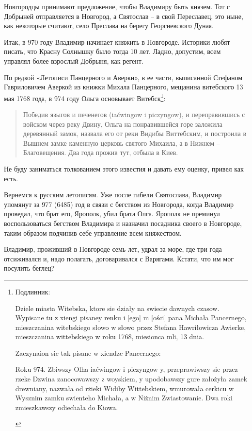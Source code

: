 Новгородцы принимают предложение, чтобы Владимиру быть князем. Тот с Добрыней отправляется в Новгород, а Святослав – в свой Переславец, это ныне, как некоторые считают, село Преслава на берегу Георгиевского Дуная.

Итак, в 970 году Владимир начинает княжить в Новгороде. Историки любят писать, что Красну Солнышку было тогда 10 лет. Ладно, допустим, всем управлял более взрослый Добрыня, как регент.

По редкой «Летописи Панцерного и Аверки», в ее части, выписанной Стефаном Гавриловичем Аверкой из книжки Михала Панцерного, мещанина витебского 13 мая 1768 года, в 974 году Ольга основывает Витебск\footnote{Подлинник:
\begin{otherlanguage}{polish}
Dziele miasta Witebska, ktore sie działy na swiecie dawnych czasow. Wypisane tu z xiengi pisaney renku i [ego] m [ości] pana Michała Pancernego, mieszczanina witebskiego słowo w słowo przez Stefana Hawriłowicza Awierke, mieszczanina
wittebskiego w roku 1768, miesionca mli, 13 dnia.

Zaczynaion sie tak pisane w xiendze Pancernego:

Roku 974. Zbiwszy Olha iaćwingow i piczyngow y, przeprawiwszy sie przez rzeke Dzwina zanocowawszy z woyskiem, y upodobawszy gure założyła zamek drewniany, nazwała od rżieki Widiby Wittebskiem, wmurowała cerkicu w Wysznim zamku swienteho Michała, a w Niżnim Zwiastowanie. Dwa roki zmieszkawszy odiechała do Kiowa.\end{otherlanguage}}:  

\begin{quotation}
Победив языгов и печенегов (iaćwingow i piczyngow), и переправившись с войском через реку Двину, Ольга на понравившейся горе 
заложила деревянный замок, назвала его от реки Видибы Виттебским, и построила в Вышнем замке  каменную церковь святого Михаила, а в Нижнем – Благовещения. Два года прожив тут, отбыла в Киев.\end{quotation}

Не буду заниматься толкованием этого известия и давать ему оценку, привел как есть. 

Вернемся к русским летописям. Уже после гибели Святослава, Владимир упомянут за 977 (6485) год в связи с бегством из Новгорода, когда Владимир проведал, что брат его, Ярополк, убил брата Олга. Ярополк не преминул воспользоваться бегством Владимира и назначил посадника своего в Новгороде, таким образом подчинив себе управление всем княжеством.

Владимир, проживший в Новгороде семь лет, удрал за море, где три года отсиживался и, надо полагать, договаривался с Варягами. Кстати, что им мог посулить беглец?

